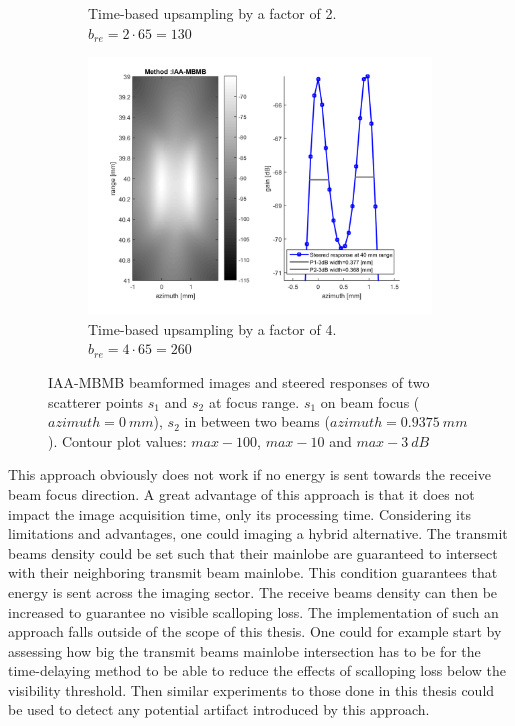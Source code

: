 \begin{figure}[ht]
\begin{subfigure}[t]{0.48\linewidth}
        \caption{Time-based upsampling by a factor of 2. $b_{re} = 2 \cdot 65 = 130$}
        \label{fig:time2}
    \end{subfigure}
    \quad
    \begin{subfigure}[t]{0.48\linewidth}
        \includegraphics[width=\linewidth]{./images/discussion/IAA-MBMB-time4.png}
        \caption{Time-based upsampling by a factor of 4. $b_{re} = 4 \cdot 65 =  260$}
        \label{fig:time4}
    \end{subfigure}
\caption{IAA-MBMB beamformed images and steered responses of two scatterer points $s_1$ and $s_2$ at focus range. $s_1$ on beam focus ($azimuth = 0~mm$), $s_2$ in between two beams ($azimuth = 0.9375~mm$). Contour plot values: $max-100$, $max-10$ and $max-3~dB$}
\label{fig:time_upsampling_IAA}
\end{figure}

This approach obviously does not work if no energy is sent towards the receive beam focus direction. A great advantage of this approach is that it does not impact the image acquisition time, only its processing time. Considering its limitations and advantages, one could imaging a hybrid alternative. The transmit beams density could be set such that their mainlobe are guaranteed to intersect with their neighboring transmit beam mainlobe. This condition guarantees that energy is sent across the imaging sector. The receive beams density can then be increased to guarantee no visible scalloping loss. The implementation of such an approach falls outside of the scope of this thesis. One could for example start by assessing how big the transmit beams mainlobe intersection has to be for the time-delaying method to be able to reduce the effects of scalloping loss below the visibility threshold. Then similar experiments to those done in this thesis could be used to detect any potential artifact introduced by this approach.

